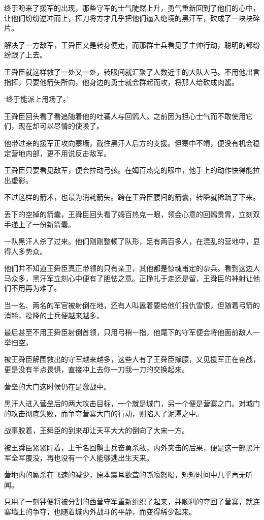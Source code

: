 终于盼来了援军的出现，那些守军的士气陡然上升，勇气重新回到了他们的心中，让他们纷纷逆冲而上，挥刀将方才几乎把他们逼入绝境的黑汗军，砍成了一块块碎片。

解决了一方敌军，王舜臣又是转身便走，而那群士兵看见了主帅行动，聪明的都纷纷跟了上去。

王舜臣就这样救了一处又一处，转眼间就汇聚了人数近千的大队人马。不用他出言指挥，只要他箭矢所向，他身边的勇士就会群起而攻，将那人给砍成肉酱。

‘终于能派上用场了。’

王舜臣回头看了看追随着他的吐蕃人与回鹘人。之前因为担心士气而不敢使用它们，现在却可以尽情的使唤了。

他带过来的援军正攻向寨墙，截住黑汗人后方的支援。但寨中不靖，便没有机会稳定营地内部，更不用说反击敌军。

王舜臣只要看见敌军，便会拉动弓弦。在姆百热克的眼中，他手上的动作快得能拉出虚影。

不过这样的箭术，也最为消耗箭矢。跨在王舜臣腰间的箭囊，转瞬就稀疏了下来。

丢下的空掉的箭囊，王舜臣回头看了姆百热克一眼，领会心意的回鹘贵胄，立刻双手递上了一份新箭囊。

一队黑汗人杀了过来。他们刚刚整顿了队形，足有两百多人，在混乱的营地中，显得人多势众。

他们并不知道王舜臣真正带领的只有亲卫，其他都是惊魂甫定的杂兵。看到这边人马众多，黑汗军立刻心中便有了胆怯之意。正挣扎于走还是留，王舜臣的神射让他们不用再为难了。

当一名、两名的军官被射倒在地，还有人叫嚣着要给他们报仇雪恨，但随着弓箭的消耗，投降的士兵便越来越多。

最后甚至不用王舜臣射倒首领，只用弓稍一指，他麾下的守军便会将他面前敌人一举扫空。

被王舜臣解围救出的守军越来越多，这些人有了王舜臣撑腰，又见援军正在奋战，更是没有半点畏惧，直接冲上去你一刀我一刀的交换起来。

营垒的大门这时候仍在是激战中。

黑汗人进入营垒后的两大攻击目标，一个就是城门，另一个便是营寨之门。对城门的攻击彻底失败，而争夺营寨大门的行动，则陷入了泥潭之中。

战事胶着，王舜臣的到来却让天平大大的倒向了大宋一方。

被王舜臣紧紧盯着，上千名回鹘士兵奋勇杀敌，内外夹击的后果，便是这一部黑汗军全军覆没，再也没有一个人能够逃出生天来。

营地内的厮杀在飞速的减少，原本震耳欲聋的嘶嚎怒喝，短短时间中几乎再无听闻。

只用了一刻钟便将被分割的西营守军重新组织了起来，并顺利的夺回了营寨，就连寨墙上的争夺，也随着城内外战斗的平静，而变得稀少起来。

